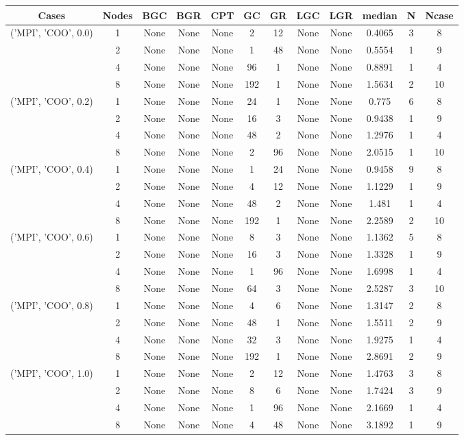 \begin{tabular}{cccccccccccc}
\hline
Cases & Nodes& BGC& BGR& CPT& GC& GR& LGC& LGR& median & N & Ncase \\
\hline
\multirow{4}{*}{('MPI', 'COO', 0.0)}& 1& None& None& None& 2& 12& None& None& 0.4065& 3& 8\\
& 2& None& None& None& 1& 48& None& None& 0.5554& 1& 9\\
& 4& None& None& None& 96& 1& None& None& 0.8891& 1& 4\\
& 8& None& None& None& 192& 1& None& None& 1.5634& 2& 10\\
\hline
\multirow{4}{*}{('MPI', 'COO', 0.2)}& 1& None& None& None& 24& 1& None& None& 0.775& 6& 8\\
& 2& None& None& None& 16& 3& None& None& 0.9438& 1& 9\\
& 4& None& None& None& 48& 2& None& None& 1.2976& 1& 4\\
& 8& None& None& None& 2& 96& None& None& 2.0515& 1& 10\\
\hline
\multirow{4}{*}{('MPI', 'COO', 0.4)}& 1& None& None& None& 1& 24& None& None& 0.9458& 9& 8\\
& 2& None& None& None& 4& 12& None& None& 1.1229& 1& 9\\
& 4& None& None& None& 48& 2& None& None& 1.481& 1& 4\\
& 8& None& None& None& 192& 1& None& None& 2.2589& 2& 10\\
\hline
\multirow{4}{*}{('MPI', 'COO', 0.6)}& 1& None& None& None& 8& 3& None& None& 1.1362& 5& 8\\
& 2& None& None& None& 16& 3& None& None& 1.3328& 1& 9\\
& 4& None& None& None& 1& 96& None& None& 1.6998& 1& 4\\
& 8& None& None& None& 64& 3& None& None& 2.5287& 3& 10\\
\hline
\multirow{4}{*}{('MPI', 'COO', 0.8)}& 1& None& None& None& 4& 6& None& None& 1.3147& 2& 8\\
& 2& None& None& None& 48& 1& None& None& 1.5511& 2& 9\\
& 4& None& None& None& 32& 3& None& None& 1.9275& 1& 4\\
& 8& None& None& None& 192& 1& None& None& 2.8691& 2& 9\\
\hline
\multirow{4}{*}{('MPI', 'COO', 1.0)}& 1& None& None& None& 2& 12& None& None& 1.4763& 3& 8\\
& 2& None& None& None& 8& 6& None& None& 1.7424& 3& 9\\
& 4& None& None& None& 1& 96& None& None& 2.1669& 1& 4\\
& 8& None& None& None& 4& 48& None& None& 3.1892& 1& 9\\
\hline
\end{tabular}
